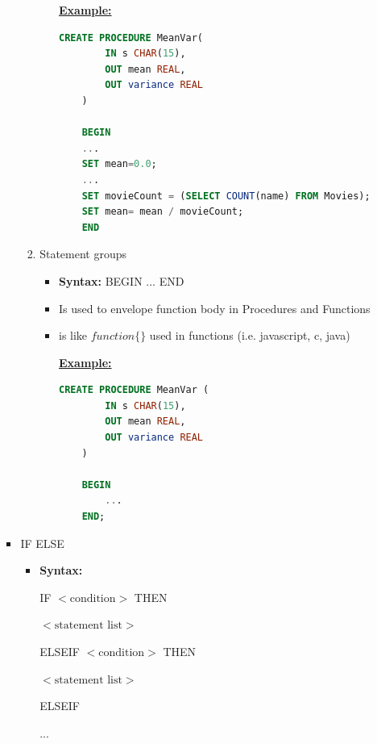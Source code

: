 \documentclass[12pt]{article}
\begin{document}
\begin{enumerate}[1.]
\begin{enumerate}[a)]
\begin{itemize}
\begin{enumerate}[1.]
\begin{itemize}
                    \underline{\textbf{Example:}}

    \begin{lstlisting}[language=SQL]
    CREATE PROCEDURE MeanVar(
        IN s CHAR(15),
        OUT mean REAL,
        OUT variance REAL
    )

    BEGIN
    ...
    SET mean=0.0;
    ...
    SET movieCount = (SELECT COUNT(name) FROM Movies);
    SET mean= mean / movieCount;
    END
    \end{lstlisting}
                \end{itemize}
                \item Statement groups
                \begin{itemize}
                    \item \textbf{Syntax:} BEGIN ... END
                    \item Is used to envelope function body in Procedures and Functions
                    \item is like $function \{\}$ used in functions (i.e. javascript, c, java)

                    \bigskip

                    \underline{\textbf{Example:}}

                    \bigskip

    \begin{lstlisting}[language=SQL]
    CREATE PROCEDURE MeanVar (
        IN s CHAR(15),
        OUT mean REAL,
        OUT variance REAL
    )

    BEGIN
        ...
    END;
    \end{lstlisting}
                \end{itemize}
            \end{enumerate}
            \item IF ELSE
            \begin{itemize}
                \item \textbf{Syntax:}

                \bigskip

                IF $<\text{condition}>$ THEN

                $<\text{statement list}>$

                ELSEIF $<\text{condition}>$ THEN

                $<\text{statement list}>$

                ELSEIF

                ...


\end{itemize}
\end{itemize}
\end{enumerate}
\end{enumerate}
\end{document}
